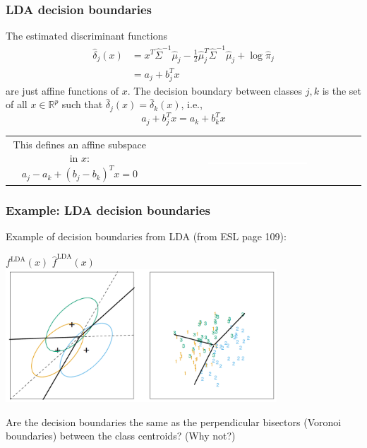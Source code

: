 \documentclass[mathserif]{beamer}
\def\R{\mathds{R}}
\def\red{\color[rgb]{0.8,0,0}}
\begin{document}
\begin{frame}
\frametitle{LDA decision boundaries}
The estimated discriminant functions
\begin{align*}
\hat{\delta}_j(x) &= x^T \hat{\Sigma}^{-1} \hat{\mu}_j - 
\frac{1}{2}\hat{\mu}_j^T \hat{\Sigma}^{-1}\hat{\mu}_j + \log\hat{\pi}_j \\
&= a_j + b_j^T x
\end{align*}
are just affine functions of $x$. 
The {\red decision boundary} between classes $j,k$ is the set of all 
$x \in \R^p$ such that $\hat{\delta}_j(x)=\hat{\delta}_k(x)$, i.e.,
$$a_j + b_j^T x = a_k + b_k^T x$$

\bigskip
\begin{tabular}{cc}
\parbox{0.45\textwidth}{
This defines an affine subspace in $x$:
$$ a_j-a_k + (b_j-b_k)^T x = 0 $$} &
\parbox{0.4\textwidth}{
\includegraphics[width=0.5\textwidth]{blank.png}}
\end{tabular}
\end{frame}

\begin{frame}
\frametitle{Example: LDA decision boundaries}
Example of decision boundaries from LDA (from ESL page 109):
\begin{center}
$f^\mathrm{LDA}(x)$ \hspace{1.5in} $\hat{f}^\mathrm{LDA}(x)$ \\
\smallskip
\includegraphics[width=4in]{ldaex.png}
\end{center} 
Are the decision boundaries the same as the perpendicular 
bisectors (Voronoi boundaries) between the class centroids?
(Why not?)
\end{frame}
\end{document}
